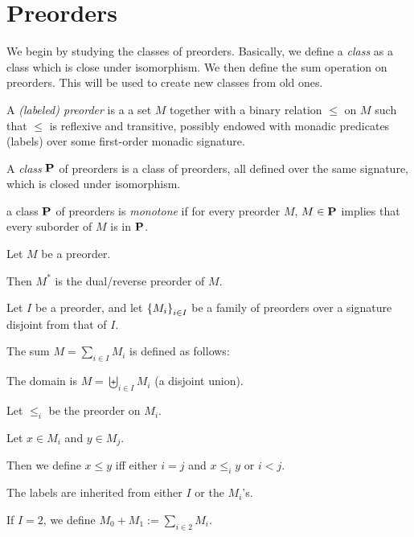 \section{Preorders}
We begin by studying the classes of preorders. Basically, we define a \emph{class} as a class which is close under
isomorphism. We then define the sum operation on preorders. This will be used to create new classes from old ones.

\begin{definitions} [Preorder]
  A \emph{(labeled) preorder} is a a set $M$
  together with a binary relation $\le$ on $M$ such that
  $\le$ is reflexive and transitive,
  possibly endowed with monadic predicates (labels)
  over some first-order monadic signature.
\end{definitions}

\begin{definition}
  A \emph{class} $\mathbf{P}$ of preorders is a class of preorders,
  all defined over the same signature,
  which is closed under isomorphism.
\end{definition}

\begin{definition}
  a class $\mathbf{P}$ of preorders is \emph{monotone} if for every preorder $M$,
  $M \in \mathbf{P}$ implies that every suborder of $M$ is in $\mathbf{P}$.
\end{definition}

\begin{definition}
  Let $M$ be a preorder.

  Then $M^\ast$ is the dual/reverse preorder of $M$.
\end{definition}

\begin{definition}
  Let $I$ be a preorder, and let $\left\{ {M_i} \right\}_{i \in I}$ be a family of preorders over
  a signature disjoint from that of $I$.

  The sum $M = \sum_{i \in I} M_i$ is defined as follows:

  The domain is $M = \biguplus_{i \in I} M_i$ (a disjoint union).

  Let $\le_i$ be the preorder on $M_i$.

  Let $x \in M_i$ and $y \in M_j$.

  Then we define $x \le y$ iff either
  $i = j$ and $x \le_i y$ or $i < j$.

  The labels are inherited from either $I$ or the $M_i$'s.

  If $I = 2$, we define $M_0 + M_1 := \sum_{i \in 2} M_i$.
\end{definition}

